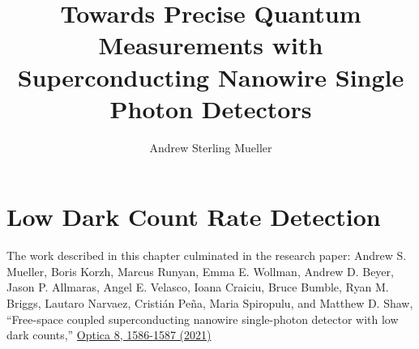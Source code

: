 \documentclass[11pt]{caltech_thesis} %
\begin{document}
\title{Towards Precise Quantum Measurements with Superconducting Nanowire Single Photon Detectors}
\author{Andrew Sterling Mueller}
\address{Pasadena, California}                     
       




\maketitle[logo]

\begin{acknowledgements}   
    
\end{acknowledgements}

\begin{abstract}
   
\end{abstract}

\begin{publishedcontent}

\end{publishedcontent}

\tableofcontents
\listoffigures
\listoftables
\printnomenclature
\mainmatter

\hypertarget{low-dark-count-rate-detection}{%
\chapter{Low Dark Count Rate Detection}\label{low-dark-count-rate-detection}}

The work described in this chapter culminated in the research paper: Andrew S. Mueller, Boris Korzh, Marcus Runyan, Emma E. Wollman, Andrew D. Beyer, Jason P. Allmaras, Angel E. Velasco, Ioana Craiciu, Bruce Bumble, Ryan M. Briggs, Lautaro Narvaez, Cristián Peña, Maria Spiropulu, and Matthew D. Shaw, ``Free-space coupled superconducting nanowire single-photon detector with low dark counts,'' \href{https://opg.optica.org/optica/fulltext.cfm?uri=optica-8-12-1586\&id=465726}{Optica 8, 1586-1587 (2021)}
\end{document}

